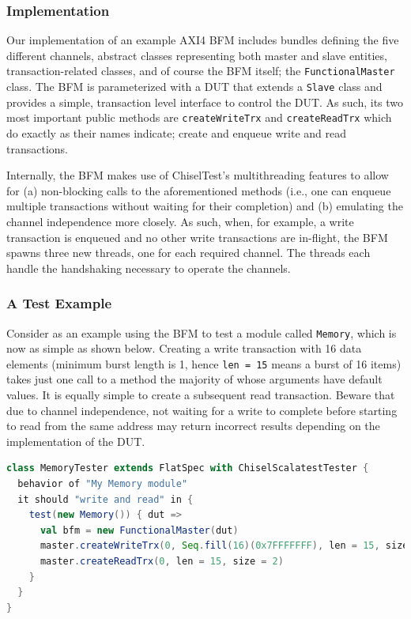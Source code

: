 \documentclass[conference]{IEEEtran}
\begin{document}
\subsubsection{Implementation}
Our implementation of an example AXI4 BFM includes bundles defining the five different channels, abstract classes representing both master and slave entities, transaction-related classes, and of course the BFM itself; the \texttt{FunctionalMaster} class. The BFM is parameterized with a DUT that extends a \texttt{Slave} class and provides a simple, transaction level interface to control the DUT. As such, its two most important public methods are \texttt{createWriteTrx} and \texttt{createReadTrx} which do exactly as their names indicate; create and enqueue write and read transactions.

Internally, the BFM makes use of ChiselTest's multithreading features to allow for (a) non-blocking calls to the aforementioned methods (i.e., one can enqueue multiple transactions without waiting for their completion) and (b) emulating the channel independence more closely. As such, when, for example, a write transaction is enqueued and no other write transactions are in-flight, the BFM spawns three new threads, one for each required channel. The threads each handle the handshaking necessary to operate the channels.

\subsubsection{A Test Example}
Consider as an example using the BFM to test a module called \texttt{Memory}, which is now as simple as shown below. Creating a write transaction with 16 data elements (minimum burst length is 1, hence \texttt{len = 15} means a burst of 16 items) takes just one call to a method the majority of whose arguments have default values. It is equally simple to create a subsequent read transaction. Beware that due to channel independence, not waiting for a write to complete before starting to read from the same address may return incorrect results depending on the implementation of the DUT.
\begin{lstlisting}[language=scala, caption={Using the AXI4 BFM with ChiselTest}, label={lst:axitest}]
class MemoryTester extends FlatSpec with ChiselScalatestTester {
  behavior of "My Memory module"
  it should "write and read" in {
    test(new Memory()) { dut =>
      val bfm = new FunctionalMaster(dut)
      master.createWriteTrx(0, Seq.fill(16)(0x7FFFFFFF), len = 15, size = 2)
      master.createReadTrx(0, len = 15, size = 2)
    }
  }
}
\end{lstlisting}
\end{document}

